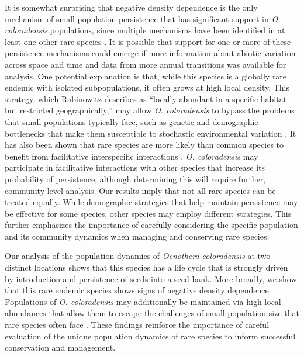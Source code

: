 \documentclass[12pt, letterpaper]{article}
\begin{document}
It is somewhat surprising that negative density dependence is the only mechanism of small population persistence that has significant support in \textit{O. coloradensis} populations, since multiple mechanisms have been identified in at least one other rare species \cite{Dibner2019}. It is possible that support for one or more of these persistence mechanisms could emerge if more information about abiotic variation across space and time and data from more annual transitions was available for analysis. One potential explanation is that, while this species is a globally rare endemic with isolated subpopulations, it often grows at high local density. This strategy, which Rabinowitz describes as “locally abundant in a specific habitat but restricted geographically,” may allow \textit{O. coloradensis} to bypass the problems that small populations typically face, such as genetic and demographic bottlenecks that make them susceptible to stochastic environmental variation \cite{Rabinowitz1981SevenRarity}. It has also been shown that rare species are more likely than common species to benefit from facilitative interspecific interactions \cite{Calatayud2020PositiveAssemblages}. \textit{O. coloradensis} may participate in facilitative interactions with other species that increase its probability of persistence, although determining this will require further, community-level analysis. Our results imply that not all rare species can be treated equally. While demographic strategies that help maintain persistence may be effective for some species, other species may employ different strategies. This further emphasizes the importance of carefully considering the specific population and its community dynamics when managing and conserving rare species.  

Our analysis of the population dynamics of \textit{Oenothera coloradensis} at two distinct locations shows that this species has a life cycle that is strongly driven by introduction and persistence of seeds into a seed bank. More broadly, we show that this rare endemic species shows signs of negative density dependence. Populations of \textit{O. coloradensis} may additionally be maintained via high local abundances that allow them to escape the challenges of small population size that rare species often face \cite{Rabinowitz1981SevenRarity}. These findings reinforce the importance of careful evaluation of the unique population dynamics of rare species to inform successful conservation and management.  



\newpage

\setcounter{figure}{0}
\setcounter{table}{0}
\setcounter{section}{0}
\setcounter{page}{1}
\end{document}
